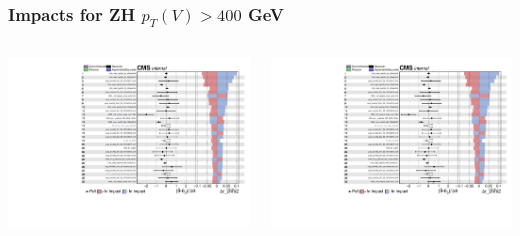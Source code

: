 \documentclass{beamer}
\begin{document}
\begin{frame}
  \frametitle{Impacts for ZH $p_T(V) > 400$ GeV}
  \centering
  \begin{columns}
    \begin{column}{0.5\linewidth}
      \includegraphics[width=0.85\linewidth,page=1]{figures/impacts/impacts_r_zhhi2.pdf}
    \end{column}
    \begin{column}{0.5\linewidth}
      \includegraphics[width=0.85\linewidth,page=2]{figures/impacts/impacts_r_zhhi2.pdf}
    \end{column}
  \end{columns}
\end{frame}
\end{document}
